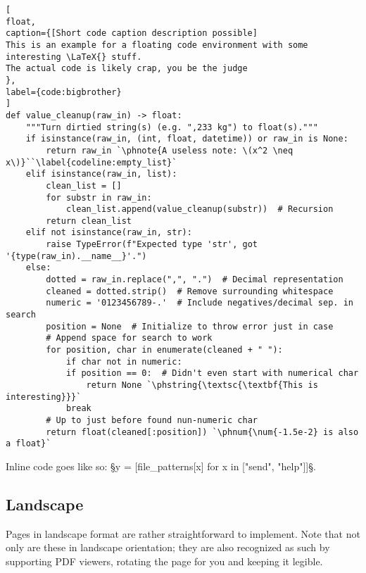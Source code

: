 \begin{lstlisting}[
float,
caption={[Short code caption description possible]
This is an example for a floating code environment with some interesting \LaTeX{} stuff.
The actual code is likely crap, you be the judge
},
label={code:bigbrother}
]
def value_cleanup(raw_in) -> float:
	"""Turn dirtied string(s) (e.g. ",233 kg") to float(s)."""
	if isinstance(raw_in, (int, float, datetime)) or raw_in is None:
		return raw_in `\phnote{A useless note: \(x^2 \neq x\)}``\label{codeline:empty_list}`
	elif isinstance(raw_in, list):
		clean_list = []
		for substr in raw_in:
			clean_list.append(value_cleanup(substr))  # Recursion
		return clean_list
	elif not isinstance(raw_in, str):
		raise TypeError(f"Expected type 'str', got '{type(raw_in).__name__}'.")
	else:
		dotted = raw_in.replace(",", ".")  # Decimal representation
		cleaned = dotted.strip()  # Remove surrounding whitespace
		numeric = '0123456789-.'  # Include negatives/decimal sep. in search
		position = None  # Initialize to throw error just in case
		# Append space for search to work
		for position, char in enumerate(cleaned + " "):
			if char not in numeric:
			if position == 0:  # Didn't even start with numerical char
				return None `\phstring{\textsc{\textbf{This is interesting}}}`
			break
		# Up to just before found nun-numeric char
		return float(cleaned[:position]) `\phnum{\num{-1.5e-2} is also a float}`
\end{lstlisting}

Inline code goes like so: §y = [file_patterns[x] for x in ["send", "help"]]§.
\begin{landscape}
\section{Landscape}

Pages in landscape format are rather straightforward to implement.
Note that not only are these in landscape orientation; they are also recognized as such by supporting PDF viewers, rotating the page for you and keeping it legible.
\end{landscape}

